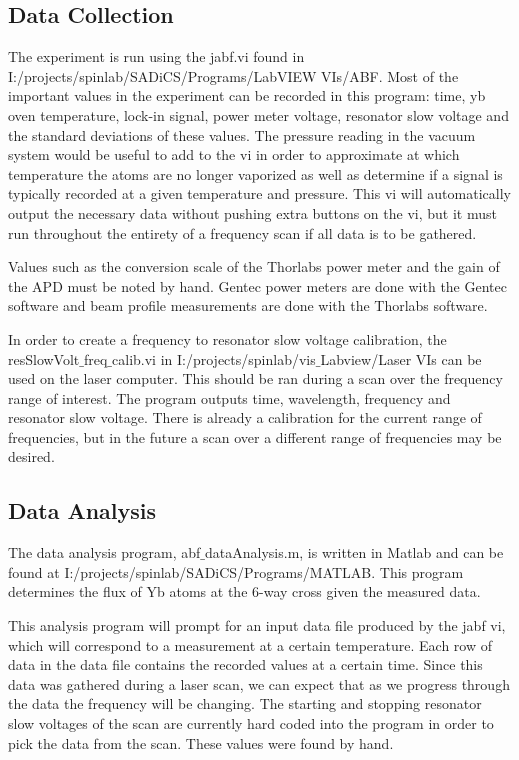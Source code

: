 \documentclass[12pt, a4paper]{article}
\begin{document}
\subsection{Data Collection}
The experiment is run using the jabf.vi found in I:/projects/spinlab/SADiCS/Programs/LabVIEW VIs/ABF. Most of the important values in the experiment can be recorded in this program: time, yb oven temperature, lock-in signal, power meter voltage, resonator slow voltage and the standard deviations of these values. The pressure reading in the vacuum system would be useful to add to the vi in order to approximate at which temperature the atoms are no longer vaporized as well as determine if a signal is typically recorded at a given temperature and pressure. This vi will automatically output the necessary data without pushing extra buttons on the vi, but it must run throughout the entirety of a frequency scan if all data is to be gathered. 

Values such as the conversion scale of the Thorlabs power meter and the gain of the APD must be noted by hand. Gentec power meters are done with the Gentec software and beam profile measurements are done with the Thorlabs software.

In order to create a frequency to resonator slow voltage calibration, the resSlowVolt$\_$freq$\_$calib.vi in I:/projects/spinlab/vis$\_$Labview/Laser VIs can be used on the laser computer. This should be ran during a scan over the frequency range of interest. The program outputs time, wavelength, frequency and resonator slow voltage. There is already a calibration for the current range of frequencies, but in the future a scan over a different range of frequencies may be desired.

\subsection{Data Analysis}
The data analysis program, abf$\_$dataAnalysis.m,  is written in Matlab and can be found at I:/projects/spinlab/SADiCS/Programs/MATLAB. This program determines the flux of Yb atoms at the 6-way cross given the measured data.

This analysis program will prompt for an input data file produced by the jabf vi, which will correspond to a measurement at a certain temperature. Each row of data in the data file contains the recorded values at a certain time. Since this data was gathered during a laser scan, we can expect that as we progress through the data the frequency will be changing. The starting and stopping resonator slow voltages of the scan are currently hard coded into the program in order to pick the data from the scan. These values were found by hand. 
\end{document}
